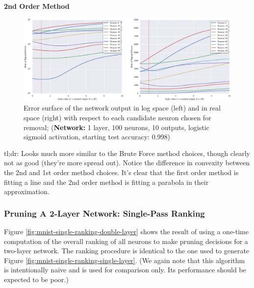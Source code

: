 \textbf{2nd Order Method}
\begin{figure}[!hb]
\centering
\includegraphics[width=\linewidth]{png/mnist-acc99-g1-gain.pdf}
\caption{Error surface of the network output in log space (left) and in real space (right) with respect to each candidate neuron chosen for removal; (\textbf{Network:} 1 layer, 100 neurons, 10 outputs, logistic sigmoid activation, starting test accuracy: 0.998)}
\label{fig:mnist-gt-single-layer}
\end{figure}
tl;dr: Looks much more similar to the Brute Force method choices, though clearly not as good (they're more spread out). Notice the difference in convexity between the 2nd and 1st order method choices. It's clear that the first order method is fitting a line and the 2nd order method is fitting a parabola in their approximation. 

\subsubsection{Pruning A 2-Layer Network: Single-Pass Ranking}
Figure \ref{fig:mnist-single-ranking-double-layer} shows the result of using a one-time computation of the overall ranking of all neurons to make pruning decisions for a two-layer network. The ranking procedure is identical to the one used to generate Figure \ref{fig:mnist-single-ranking-single-layer}. (We again note that this algorithm is intentionally naive and is used for comparison only. Its performance should be expected to be poor.) 

